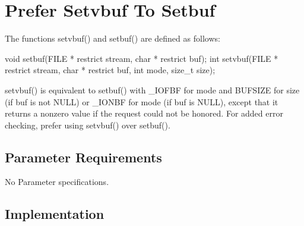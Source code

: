 %
%

\section{Prefer Setvbuf To Setbuf}
\label{PreferSetvbufToSetbuf::overview}

The functions setvbuf() and setbuf() are defined as follows:

void setbuf(FILE * restrict stream, char * restrict buf);
int setvbuf(FILE * restrict stream, char * restrict buf, int mode, size\_t size);

setvbuf() is equivalent to setbuf() with \_IOFBF for mode and BUFSIZE for size
(if buf is not NULL) or \_IONBF for mode (if buf is NULL), except that it
returns a nonzero value if the request could not be honored. For added error
checking, prefer using setvbuf() over setbuf().

\subsection{Parameter Requirements}

   No Parameter specifications.

\subsection{Implementation}


